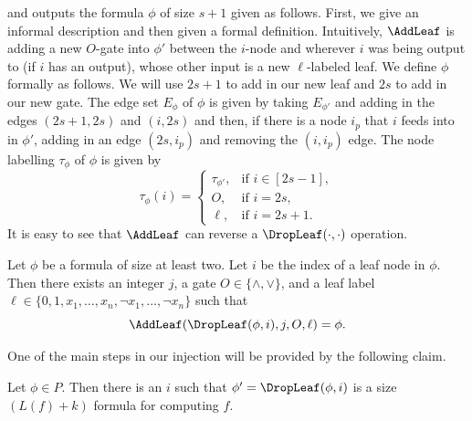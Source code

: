 and outputs the formula $\phi$ of size $s+1$ given as follows. First, we give an informal description and then given a formal definition.
Intuitively, $\AddLeaf$ is adding a new $O$-gate into $\phi'$ between the $i$-node and wherever $i$ was being output to (if $i$ has an output), whose other input is a new $\ell$-labeled leaf.
We define $\phi$ formally as follows. We will use $2s+1$ to add in our new leaf and $2s$ to add in our new gate. The edge set $E_\phi$ of $\phi$ is given by taking $E_{\phi'}$ and adding in the edges $(2s+1,2s)$ and $(i,2s)$ and then, if there is a node $i_p$ that $i$ feeds into in $\phi'$, adding in an edge $(2s,i_p)$ and removing the $(i,i_p)$ edge. The node labelling $\tau_\phi$ of $\phi$ is given by
\[\tau_\phi(i)=\begin{cases}\tau_{\phi'},&\text{if }i\in[2s-1],\\O,&\text{if }i=2s,\\\ell,&\text{if }i=2s+1.\end{cases}\]
It is easy to see that $\AddLeaf$ can reverse a $\DropLeaf(\cdot,\cdot)$ operation.
\begin{ntclaim}
Let $\phi$ be a formula of size at least two. Let $i$ be the index of a leaf node in $\phi$. Then there exists an integer $j$, a gate $O\in\{\land,\lor\}$, and a leaf label $\ell\in\{0,1,x_1,\ldots,x_n,\neg x_1,\ldots,\neg x_n\}$ such that
\[\AddLeaf(\DropLeaf(\phi,i),j,O,\ell)=\phi.\]
\end{ntclaim}
One of the main steps in our injection will be provided by the following claim.
\begin{ntclaim}
Let $\phi\in P$. Then there is an $i$ such that $\phi'=\DropLeaf(\phi,i)$ is a size $(L(f)+k)$ formula for computing $f$.
\end{ntclaim}
